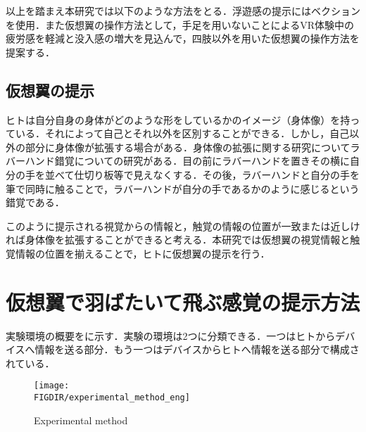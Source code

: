 \begin{small}

    以上を踏まえ本研究では以下のような方法をとる．浮遊感の提示にはベクションを使用．また仮想翼の操作方法として，手足を用いないことによるVR体験中の疲労感を軽減と没入感の増大を見込んで，四肢以外を用いた仮想翼の操作方法を提案する．

  \subsection{仮想翼の提示}
    ヒトは自分自身の身体がどのような形をしているかのイメージ（身体像）を持っている．それによって自己とそれ以外を区別することができる．しかし，自己以外の部分に身体像が拡張する場合がある．身体像の拡張に関する研究についてラバーハンド錯覚についての研究がある\cite{botvinick1998rubber}．目の前にラバーハンドを置きその横に自分の手を並べて仕切り板等で見えなくする．その後，ラバーハンドと自分の手を筆で同時に触ることで，ラバーハンドが自分の手であるかのように感じるという錯覚である．
    
    このように提示される視覚からの情報と，触覚の情報の位置が一致または近しければ身体像を拡張することができると考える．本研究では仮想翼の視覚情報と触覚情報の位置を揃えることで，ヒトに仮想翼の提示を行う．  



  

\section{仮想翼で羽ばたいて飛ぶ感覚の提示方法}
  実験環境の概要をに示す．実験の環境は2つに分類できる．一つはヒトからデバイスへ情報を送る部分．もう一つはデバイスからヒトへ情報を送る部分で構成されている．
  
  \begin{figure}[b]
    \begin{center}
      \texttt{[image: \\FIGDIR/experimental\_method\_eng]}%
      \caption{Experimental method}
    \end{center}
  \end{figure}


\end{small}
